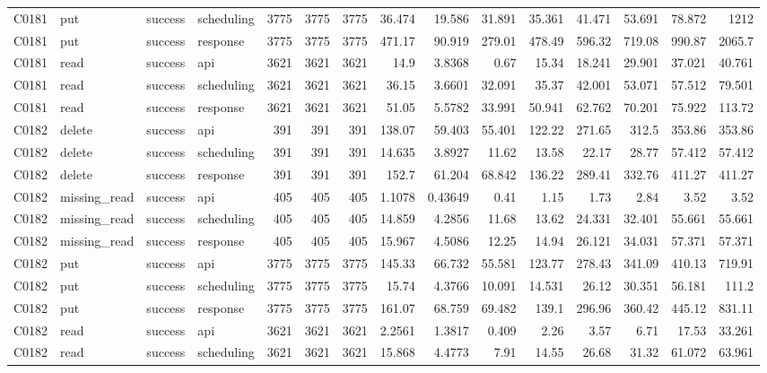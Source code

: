 \begin{landscape}
\begin{longtable}{llllrrrrrrrrrrr}
C0181 & put & success & scheduling & 3775 & 3775 & 3775 & 36.474 & 19.586 & 31.891 & 35.361 & 41.471 & 53.691 & 78.872 & 1212\\
C0181 & put & success & response & 3775 & 3775 & 3775 & 471.17 & 90.919 & 279.01 & 478.49 & 596.32 & 719.08 & 990.87 & 2065.7\\
C0181 & read & success & api & 3621 & 3621 & 3621 & 14.9 & 3.8368 & 0.67 & 15.34 & 18.241 & 29.901 & 37.021 & 40.761\\
C0181 & read & success & scheduling & 3621 & 3621 & 3621 & 36.15 & 3.6601 & 32.091 & 35.37 & 42.001 & 53.071 & 57.512 & 79.501\\
C0181 & read & success & response & 3621 & 3621 & 3621 & 51.05 & 5.5782 & 33.991 & 50.941 & 62.762 & 70.201 & 75.922 & 113.72\\
C0182 & delete & success & api & 391 & 391 & 391 & 138.07 & 59.403 & 55.401 & 122.22 & 271.65 & 312.5 & 353.86 & 353.86\\
C0182 & delete & success & scheduling & 391 & 391 & 391 & 14.635 & 3.8927 & 11.62 & 13.58 & 22.17 & 28.77 & 57.412 & 57.412\\
C0182 & delete & success & response & 391 & 391 & 391 & 152.7 & 61.204 & 68.842 & 136.22 & 289.41 & 332.76 & 411.27 & 411.27\\
C0182 & missing\_\allowbreak{}read & success & api & 405 & 405 & 405 & 1.1078 & 0.43649 & 0.41 & 1.15 & 1.73 & 2.84 & 3.52 & 3.52\\
C0182 & missing\_\allowbreak{}read & success & scheduling & 405 & 405 & 405 & 14.859 & 4.2856 & 11.68 & 13.62 & 24.331 & 32.401 & 55.661 & 55.661\\
C0182 & missing\_\allowbreak{}read & success & response & 405 & 405 & 405 & 15.967 & 4.5086 & 12.25 & 14.94 & 26.121 & 34.031 & 57.371 & 57.371\\
C0182 & put & success & api & 3775 & 3775 & 3775 & 145.33 & 66.732 & 55.581 & 123.77 & 278.43 & 341.09 & 410.13 & 719.91\\
C0182 & put & success & scheduling & 3775 & 3775 & 3775 & 15.74 & 4.3766 & 10.091 & 14.531 & 26.12 & 30.351 & 56.181 & 111.2\\
C0182 & put & success & response & 3775 & 3775 & 3775 & 161.07 & 68.759 & 69.482 & 139.1 & 296.96 & 360.42 & 445.12 & 831.11\\
C0182 & read & success & api & 3621 & 3621 & 3621 & 2.2561 & 1.3817 & 0.409 & 2.26 & 3.57 & 6.71 & 17.53 & 33.261\\
C0182 & read & success & scheduling & 3621 & 3621 & 3621 & 15.868 & 4.4773 & 7.91 & 14.55 & 26.68 & 31.32 & 61.072 & 63.961\\

\end{longtable}
\end{landscape}
